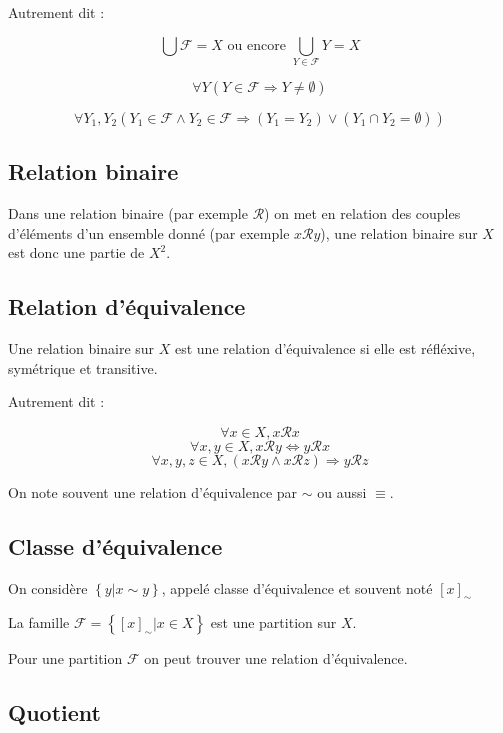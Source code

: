 \documentclass[a4paper,10pt]{article}
\begin{document}
Autrement dit :

$$\bigcup \mathcal{F} = X \mbox{ ou encore } \bigcup\limits_{Y \in \mathcal{F}} Y = X$$

$$\forall Y (Y \in \mathcal{F} \Rightarrow Y \neq \emptyset)$$

$$\forall Y_1, Y_2 (Y_1 \in \mathcal{F} \wedge Y_2 \in \mathcal{F} \Rightarrow (Y_1 = Y_2) \vee (Y_1 \cap Y_2 = \emptyset))$$

\subsection{Relation binaire}

Dans une relation binaire (par exemple $\mathcal{R}$) on met en relation des couples d'éléments d'un ensemble donné (par exemple $x \mathcal{R} y$), une relation binaire sur $X$ est donc une partie de $X^2$.

\subsection{Relation d'équivalence}

Une relation binaire sur $X$ est une relation d'équivalence si elle est réfléxive, symétrique et transitive.

Autrement dit :

$$\forall x \in X, x \mathcal{R} x$$
$$\forall x,y \in X, x \mathcal{R} y \Leftrightarrow y \mathcal{R} x$$
$$\forall x,y,z \in X, (x \mathcal{R} y \wedge x \mathcal{R} z) \Rightarrow y \mathcal{R} z$$

On note souvent une relation d'équivalence par $\sim$ ou aussi $\equiv$.

\subsection{Classe d'équivalence}

On considère $\left\lbrace y \vert x \sim y \right\rbrace$, appelé classe d'équivalence et souvent noté $\left[ x \right]_\sim$

La famille $\mathcal{F} = \left\lbrace { \left[ x \right]_\sim } \vert x \in X \right\rbrace$ est une partition sur $X$.

Pour une partition $\mathcal{F}$ on peut trouver une relation d'équivalence.

\subsection{Quotient}
\end{document}
